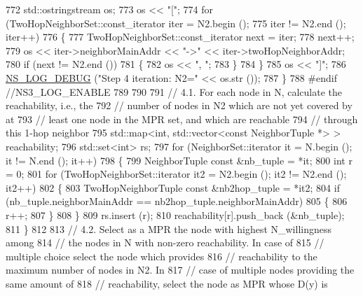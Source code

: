 \begin{DoxyCode}
772         std::ostringstream os;
773         os << \textcolor{stringliteral}{"["};
774         \textcolor{keywordflow}{for} (TwoHopNeighborSet::const\_iterator iter = N2.begin ();
775              iter != N2.end (); iter++)
776           \{
777             TwoHopNeighborSet::const\_iterator next = iter;
778             next++;
779             os << iter->neighborMainAddr << \textcolor{stringliteral}{"->"} << iter->twoHopNeighborAddr;
780             \textcolor{keywordflow}{if} (next != N2.end ())
781               \{
782                 os << \textcolor{stringliteral}{", "};
783               \}
784           \}
785         os << \textcolor{stringliteral}{"]"};
786         \hyperlink{group__logging_ga413f1886406d49f59a6a0a89b77b4d0a}{NS\_LOG\_DEBUG} (\textcolor{stringliteral}{"Step 4 iteration: N2="} << os.str ());
787       \}
788 \textcolor{preprocessor}{#endif  //NS3\_LOG\_ENABLE}
789 
790 
791       \textcolor{comment}{// 4.1. For each node in N, calculate the reachability, i.e., the}
792       \textcolor{comment}{// number of nodes in N2 which are not yet covered by at}
793       \textcolor{comment}{// least one node in the MPR set, and which are reachable}
794       \textcolor{comment}{// through this 1-hop neighbor}
795       std::map<int, std::vector<const NeighborTuple *> > reachability;
796       std::set<int> rs;
797       \textcolor{keywordflow}{for} (NeighborSet::iterator it = N.begin (); it != N.end (); it++)
798         \{
799           NeighborTuple \textcolor{keyword}{const} &nb\_tuple = *it;
800           \textcolor{keywordtype}{int} r = 0;
801           \textcolor{keywordflow}{for} (TwoHopNeighborSet::iterator it2 = N2.begin (); it2 != N2.end (); it2++)
802             \{
803               TwoHopNeighborTuple \textcolor{keyword}{const} &nb2hop\_tuple = *it2;
804               \textcolor{keywordflow}{if} (nb\_tuple.neighborMainAddr == nb2hop\_tuple.neighborMainAddr)
805                 \{
806                   r++;
807                 \}
808             \}
809           rs.insert (r);
810           reachability[r].push\_back (&nb\_tuple);
811         \}
812 
813       \textcolor{comment}{// 4.2. Select as a MPR the node with highest N\_willingness among}
814       \textcolor{comment}{// the nodes in N with non-zero reachability. In case of}
815       \textcolor{comment}{// multiple choice select the node which provides}
816       \textcolor{comment}{// reachability to the maximum number of nodes in N2. In}
817       \textcolor{comment}{// case of multiple nodes providing the same amount of}
818       \textcolor{comment}{// reachability, select the node as MPR whose D(y) is}

\end{DoxyCode}
